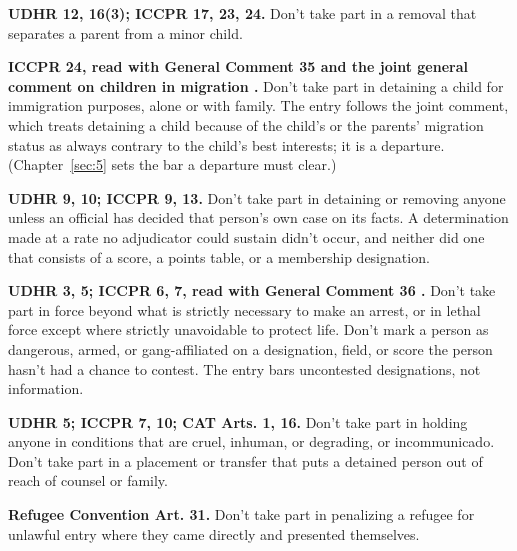 \textbf{UDHR 12, 16(3); ICCPR 17, 23, 24.} Don't take part in a removal that separates a parent from a minor child.

\textbf{ICCPR 24, read with General Comment 35 \autocite{hrc2014gc35} and the joint general comment on children in migration \autocite{cmwcrc2017jgc}.} Don't take part in detaining a child for immigration purposes, alone or with family. The entry follows the joint comment, which treats detaining a child because of the child's or the parents' migration status as always contrary to the child's best interests; it is a departure. (Chapter~\ref{sec:5} sets the bar a departure must clear.)

\textbf{UDHR 9, 10; ICCPR 9, 13.} Don't take part in detaining or removing anyone unless an official has decided that person's own case on its facts. A determination made at a rate no adjudicator could sustain didn't occur, and neither did one that consists of a score, a points table, or a membership designation.

\textbf{UDHR 3, 5; ICCPR 6, 7, read with General Comment 36 \autocite{hrc2018gc36}.} Don't take part in force beyond what is strictly necessary to make an arrest, or in lethal force except where strictly unavoidable to protect life. Don't mark a person as dangerous, armed, or gang-affiliated on a designation, field, or score the person hasn't had a chance to contest. The entry bars uncontested designations, not information.

\textbf{UDHR 5; ICCPR 7, 10; CAT Arts. 1, 16.} Don't take part in holding anyone in conditions that are cruel, inhuman, or degrading, or incommunicado. Don't take part in a placement or transfer that puts a detained person out of reach of counsel or family.

\textbf{Refugee Convention Art. 31.} Don't take part in penalizing a refugee for unlawful entry where they came directly and presented themselves.

